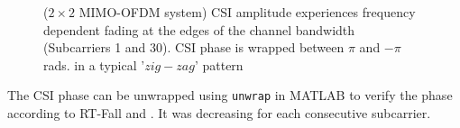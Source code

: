 \begin{figure}[H]%
    \centering
    \qquad
    \caption{($2\times 2$ MIMO-OFDM system) CSI amplitude experiences frequency dependent fading at the edges of the channel bandwidth (Subcarriers 1 and 30). CSI phase is wrapped between $\pi$ and $-\pi$ rads. in a typical '$zig-zag$' pattern}%
    \label{fig:CSIAMPLITUDE&PHASE}%
\end{figure}
The CSI phase can be unwrapped using \lstinline{unwrap} in MATLAB to verify the phase according to RT-Fall and \cite{perceivingAccurateCSI}. It was decreasing for each consecutive subcarrier.

